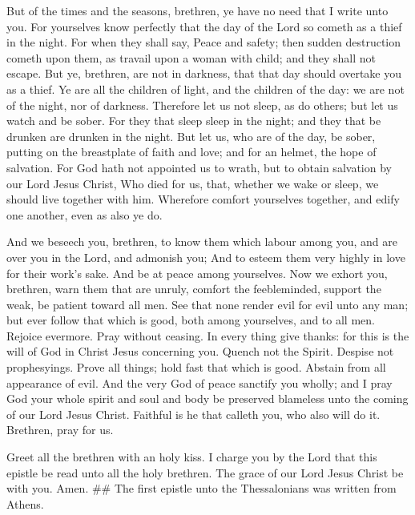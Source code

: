  But of the times and the seasons, brethren, ye have no
need that I write unto you.  For yourselves know perfectly
that the day of the Lord so cometh as a thief in the night.
 For when they shall say, Peace and safety; then sudden
destruction cometh upon them, as travail upon a woman with child; and
they shall not escape.  But ye, brethren, are not in
darkness, that that day should overtake you as a thief. 
Ye are all the children of light, and the children of the day: we are
not of the night, nor of darkness.  Therefore let us not
sleep, as do others; but let us watch and be sober.  For
they that sleep sleep in the night; and they that be drunken are drunken
in the night.  But let us, who are of the day, be sober,
putting on the breastplate of faith and love; and for an helmet, the
hope of salvation.  For God hath not appointed us to
wrath, but to obtain salvation by our Lord Jesus Christ, 
Who died for us, that, whether we wake or sleep, we should live together
with him.  Wherefore comfort yourselves together, and
edify one another, even as also ye do.

 And we beseech you, brethren, to know them which labour
among you, and are over you in the Lord, and admonish you;
 And to esteem them very highly in love for their work's
sake. And be at peace among yourselves.  Now we exhort
you, brethren, warn them that are unruly, comfort the feebleminded,
support the weak, be patient toward all men.  See that
none render evil for evil unto any man; but ever follow that which is
good, both among yourselves, and to all men.  Rejoice
evermore.  Pray without ceasing.  In every
thing give thanks: for this is the will of God in Christ Jesus
concerning you.  Quench not the Spirit. 
Despise not prophesyings.  Prove all things; hold fast
that which is good.  Abstain from all appearance of evil.
 And the very God of peace sanctify you wholly; and I
pray God your whole spirit and soul and body be preserved blameless unto
the coming of our Lord Jesus Christ.  Faithful is he that
calleth you, who also will do it.  Brethren, pray for us.

 Greet all the brethren with an holy kiss.
 I charge you by the Lord that this epistle be read unto
all the holy brethren.  The grace of our Lord Jesus
Christ be with you. Amen. \#\# The first epistle unto the Thessalonians
was written from Athens.
